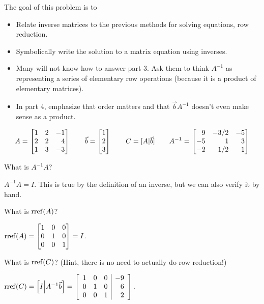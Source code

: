 \documentclass{workbook}
\newcommand{\bookonlynewpage}{\begin{bookonly}\newpage\end{bookonly}}
\begin{document}
\begin{slide}
	\bookonlynewpage
	\question
	\begin{annotation}
		\begin{goals}

			The goal of this problem is to
			\begin{itemize}
				\item Relate inverse matrices to the previous methods for solving
					equations, row reduction.
				\item Symbolically write the solution to a matrix equation using inverses.
			\end{itemize}
		\end{goals}

		\begin{notes}
			\begin{itemize}
				\item Many will not know how to answer part 3. Ask them
					to think $A^{-1}$ as representing a series of elementary row
					operations (because it is a product of elementary matrices).
				\item In part 4, emphasize that order matters and that $\vec bA^{-1}$ doesn't
					even make sense as a product.
			\end{itemize}
		\end{notes}
	\end{annotation}
	\[
		A=\mat{1&2&-1\\2&2&4\\1&3&-3}\qquad
		\vec b=\mat{1\\2\\3}\qquad
		C=[A|\vec b]\qquad
		A^{-1}=\mat{9&-3/2&-5\\-5&1&3\\-2&1/2&1}
	\]
	\begin{parts}
		\item What is $A^{-1}A$?
			\begin{solution}
				$A^{-1}A = I$. This is true by the definition of an inverse,
				but we can also verify it by hand.
			\end{solution}
		\item What is $\operatorname{rref}(A)$?
			\begin{solution}
				$\rref(A) = \mat{1&0&0\\0&1&0\\0&0&1} = I$.
			\end{solution}
		\item What is $\operatorname{rref}(C)$? (Hint, there is no need to actually do row reduction!)
			\begin{solution}
				$\operatorname{rref}(C) = \left[I\middle|A^{-1}\vec b\right]
				=\left[
					\begin{array}{rrr|r}
						1&0&0&-9\\
						0&1&0&6\\
						0&0&1&2
					\end{array}
				\right]$.


\end{solution}
\end{parts}
\end{slide}
\end{document}

